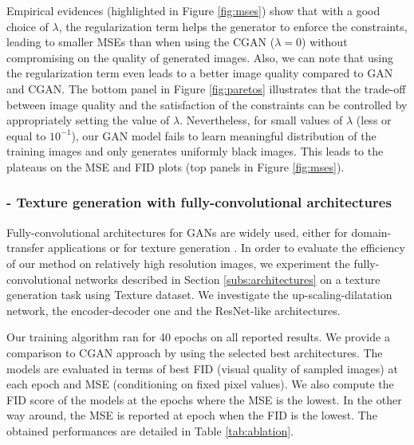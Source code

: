 Empirical evidences (highlighted in Figure \ref{fig:mses}) show that with a good choice of $\lambda$, the regularization term helps the generator to enforce the constraints, leading to smaller \ac{MSE}s than when using the \ac{CGAN} ($\lambda=0$) without compromising on the quality of generated images. Also, we can note that using the regularization term even leads to a better image quality compared to \ac{GAN} and \ac{CGAN}.
%
The bottom panel in Figure \ref{fig:paretos} illustrates that the trade-off between image quality and the satisfaction of the constraints can be controlled by appropriately setting the value of $\lambda$. Nevertheless, for small values of $\lambda$ (less or equal to $10^{-1}$), our GAN model fails to learn meaningful distribution of the training images and only generates uniformly black images. This leads to the plateaus on the \ac{MSE} and \ac{FID} plots (top panels in Figure \ref{fig:mses}).




\subsubsection{- Texture generation with fully-convolutional architectures}
\label{sub:fcnn}
Fully-convolutional architectures for GANs are widely used, either for domain-transfer applications \citep{Zhu2017, Isola2016} or for texture generation \citep{Jetchev2017}. In order to evaluate the efficiency of our method on relatively high resolution images, we experiment the fully-convolutional networks described in Section \ref{subs:architectures} on a texture generation task using Texture dataset. We investigate the up-scaling-dilatation network, the encoder-decoder one and the ResNet-like architectures.

Our training algorithm ran for 40 epochs on all reported results. We provide a comparison to CGAN \citep{Mirza2014} approach by using the selected best architectures.
The models are evaluated in terms of best FID (visual quality of sampled images) at each epoch and MSE (conditioning on fixed pixel values).  We also compute the FID score of the models at the epochs where the MSE is the lowest. In the other way around, the MSE is reported at epoch when the FID is the lowest. The obtained performances are detailed in Table \ref{tab:ablation}.

